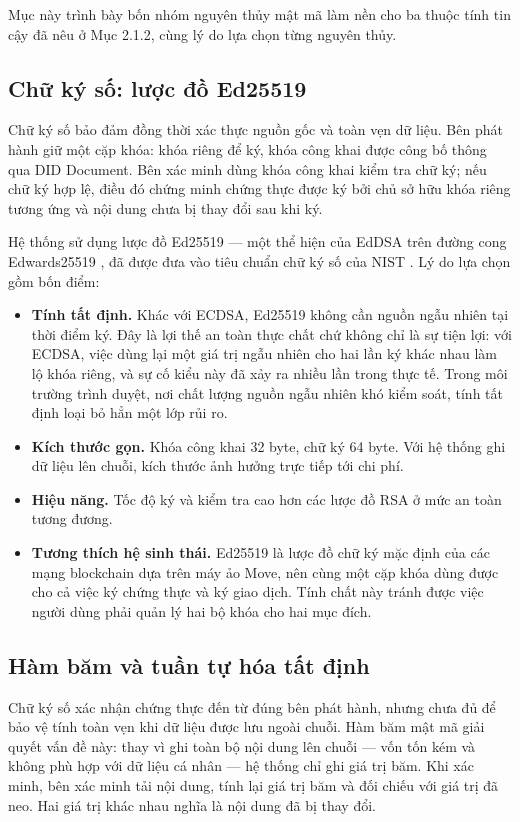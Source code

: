 Mục này trình bày bốn nhóm nguyên thủy mật mã làm nền cho ba thuộc tính tin cậy đã nêu ở Mục 2.1.2, cùng lý do lựa chọn từng nguyên thủy.

\subsection{Chữ ký số: lược đồ Ed25519}

Chữ ký số bảo đảm đồng thời xác thực nguồn gốc và toàn vẹn dữ liệu. Bên phát hành giữ một cặp khóa: khóa riêng để ký, khóa công khai được công bố thông qua DID Document. Bên xác minh dùng khóa công khai kiểm tra chữ ký; nếu chữ ký hợp lệ, điều đó chứng minh chứng thực được ký bởi chủ sở hữu khóa riêng tương ứng và nội dung chưa bị thay đổi sau khi ký.

Hệ thống sử dụng lược đồ Ed25519 --- một thể hiện của EdDSA trên đường cong Edwards25519 \cite{RFC8032}, đã được đưa vào tiêu chuẩn chữ ký số của NIST \cite{NIST_FIPS186_5}. Lý do lựa chọn gồm bốn điểm:

\begin{itemize}
    \item \textbf{Tính tất định.} Khác với ECDSA, Ed25519 không cần nguồn ngẫu nhiên tại thời điểm ký. Đây là lợi thế an toàn thực chất chứ không chỉ là sự tiện lợi: với ECDSA, việc dùng lại một giá trị ngẫu nhiên cho hai lần ký khác nhau làm lộ khóa riêng, và sự cố kiểu này đã xảy ra nhiều lần trong thực tế. Trong môi trường trình duyệt, nơi chất lượng nguồn ngẫu nhiên khó kiểm soát, tính tất định loại bỏ hẳn một lớp rủi ro.
    \item \textbf{Kích thước gọn.} Khóa công khai 32 byte, chữ ký 64 byte. Với hệ thống ghi dữ liệu lên chuỗi, kích thước ảnh hưởng trực tiếp tới chi phí.
    \item \textbf{Hiệu năng.} Tốc độ ký và kiểm tra cao hơn các lược đồ RSA ở mức an toàn tương đương.
    \item \textbf{Tương thích hệ sinh thái.} Ed25519 là lược đồ chữ ký mặc định của các mạng blockchain dựa trên máy ảo Move, nên cùng một cặp khóa dùng được cho cả việc ký chứng thực và ký giao dịch. Tính chất này tránh được việc người dùng phải quản lý hai bộ khóa cho hai mục đích.
\end{itemize}

\subsection{Hàm băm và tuần tự hóa tất định}

Chữ ký số xác nhận chứng thực đến từ đúng bên phát hành, nhưng chưa đủ để bảo vệ tính toàn vẹn khi dữ liệu được lưu ngoài chuỗi. Hàm băm mật mã giải quyết vấn đề này: thay vì ghi toàn bộ nội dung lên chuỗi --- vốn tốn kém và không phù hợp với dữ liệu cá nhân --- hệ thống chỉ ghi giá trị băm. Khi xác minh, bên xác minh tải nội dung, tính lại giá trị băm và đối chiếu với giá trị đã neo. Hai giá trị khác nhau nghĩa là nội dung đã bị thay đổi.

